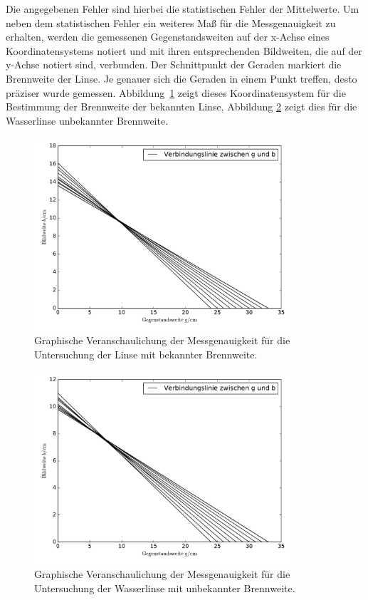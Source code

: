 \documentclass[
  parskip=half,
  bibliography=totoc,     %
  captions=tableheading,  %
  titlepage=firstiscover, %
]{scrartcl}
\begin{document}
Die angegebenen Fehler sind hierbei die statistischen Fehler der Mittelwerte. Um neben dem statistischen
Fehler ein weiteres Maß für die Messgenauigkeit zu erhalten, werden die gemessenen Gegenstandsweiten auf
der x-Achse eines Koordinatensystems notiert und mit ihren entsprechenden Bildweiten, die auf der y-Achse
notiert sind, verbunden. Der Schnittpunkt der Geraden markiert die Brennweite der Linse. Je genauer sich
die Geraden in einem Punkt treffen, desto präziser wurde gemessen. Abbildung~\ref{fig:plot_1}
zeigt dieses Koordinatensystem für die Bestimmung der Brennweite der bekannten Linse, Abbildung
\ref{fig:plot_2} zeigt dies für die Wasserlinse unbekannter Brennweite.

\begin{figure}[H]
    \centering
    \includegraphics[width=0.85\textwidth]{sam.pdf}
    \caption{Graphische Veranschaulichung der Messgenauigkeit für die Untersuchung der Linse mit bekannter Brennweite.}
    \label{fig:plot_1}
\end{figure}

\begin{figure}[H]
    \centering
    \includegraphics[width=0.85\textwidth]{sam1.pdf}
    \caption{Graphische Veranschaulichung der Messgenauigkeit für die Untersuchung der Wasserlinse mit unbekannter Brennweite.}
    \label{fig:plot_2}
\end{figure}
\end{document}
